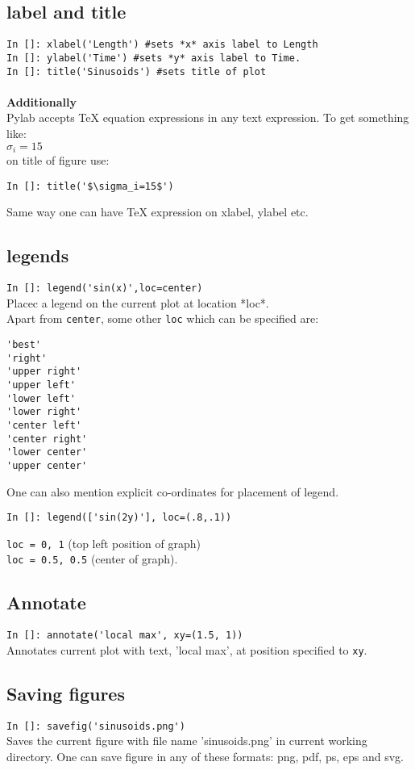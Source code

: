 \documentclass[12pt]{article}
\newcommand{\typ}[1]{\lstinline{#1}}
\begin{document}
\subsection{label and title}
\typ{In []: xlabel('Length') #sets *x* axis label to Length}\\ 
\typ{In []: ylabel('Time') #sets *y* axis label to Time.}\\
\typ{In []: title('Sinusoids') #sets title of plot}\\
\\
\textbf{Additionally}\\
Pylab accepts TeX equation expressions in any text expression. To get something like:\\
$\sigma_i=15$ \\
on title of figure use: 
\begin{lstlisting}
In []: title('$\sigma_i=15$')
\end{lstlisting}  
Same way one can have TeX expression on xlabel, ylabel etc.

\subsection{legends}
\typ{In []: legend('sin(x)',loc=center)} \\
Placec a legend on the current plot at location *loc*.\\
Apart from \typ{center}, some other \typ{loc} which can be specified are:
\begin{lstlisting}
'best'
'right'
'upper right'
'upper left'      
'lower left'      
'lower right'     
'center left'     
'center right'    
'lower center'    
'upper center'    
\end{lstlisting}
\newpage
One can also mention explicit co-ordinates for placement of legend. 
\begin{lstlisting}
In []: legend(['sin(2y)'], loc=(.8,.1)) 
\end{lstlisting}
\typ{loc = 0, 1} (top left position of graph)\\
\typ{loc = 0.5, 0.5} (center of graph).

\subsection{Annotate}
\typ{In []: annotate('local max', xy=(1.5, 1))}\\
Annotates current plot with text, 'local max', at position specified to \typ{xy}.

\subsection{Saving figures}
\typ{In []: savefig('sinusoids.png')}\\
Saves the current figure with file name 'sinusoids.png' in current working directory. One can save figure in any of these formats: png, pdf, ps, eps and svg.
\end{document}
